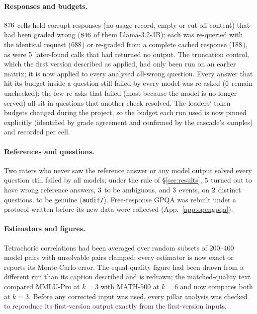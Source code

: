 \documentclass[11pt]{article}
\theoremstyle{plain}
\theoremstyle{definition}
\begin{document}
\paragraph{Responses and budgets.} $876$ cells held corrupt responses (no usage record, empty or cut-off content)
that had been graded wrong ($846$ of them Llama-3.2-3B); each was re-queried with the identical request
($688$) or re-graded from a complete cached response ($188$), as were $5$
later-found calls that had returned no output. The truncation control, which the first version described as
applied, had only been run on an earlier matrix; it is now applied to every analysed all-wrong question. Every answer that hit its budget inside a question still failed by every
model was re-asked ($0$ remain unchecked); the few re-asks that failed (most because the model is no longer served)
all sit in questions that another check resolved. The loaders' token budgets changed during the project, so the budget each run used is now
pinned explicitly (identified by grade agreement and confirmed by the cascade's samples) and recorded per cell.

\paragraph{References and questions.} Two raters who never saw the reference answer or any model output solved every question
still failed by all models; under the rule of \S\ref{sec:results}, $5$ turned out to have wrong reference answers,
$3$ to be ambiguous, and $3$ events, on $2$ distinct questions, to be genuine (\texttt{audit/}). Free-response GPQA was rebuilt under a
protocol written before its new data were collected (App.~\ref{app:opengpqa}).

\paragraph{Estimators and figures.} Tetrachoric correlations had been averaged over random subsets of $200$--$400$ model pairs
with unsolvable pairs clamped; every estimator is now exact or reports its Monte-Carlo error. The equal-quality figure had been
drawn from a different run than its caption described and is redrawn; the matched-quality text compared MMLU-Pro at $k{=}3$
with MATH-500 at $k{=}6$ and now compares both at $k{=}3$. Before any corrected input was used, every pillar analysis was
checked to reproduce its first-version output exactly from the first-version inputs.
\end{document}
